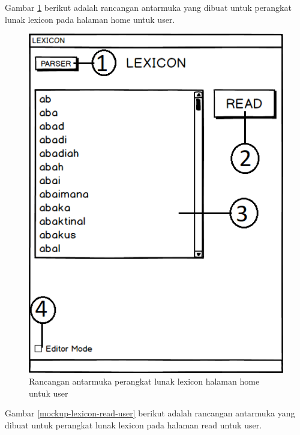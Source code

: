 Gambar \ref{mockup-lexicon-home-user} berikut adalah rancangan antarmuka yang dibuat untuk perangkat lunak lexicon pada halaman home untuk user.

\begin{figure}[H]
\centering
\includegraphics[scale=0.8]{Gambar/mockup-lexicon-home-user}
\caption{Rancangan antarmuka perangkat lunak lexicon halaman home untuk user} 
\label{mockup-lexicon-home-user}
\end{figure}

Gambar \ref{mockup-lexicon-read-user} berikut adalah rancangan antarmuka yang dibuat untuk perangkat lunak lexicon pada halaman read untuk user.

